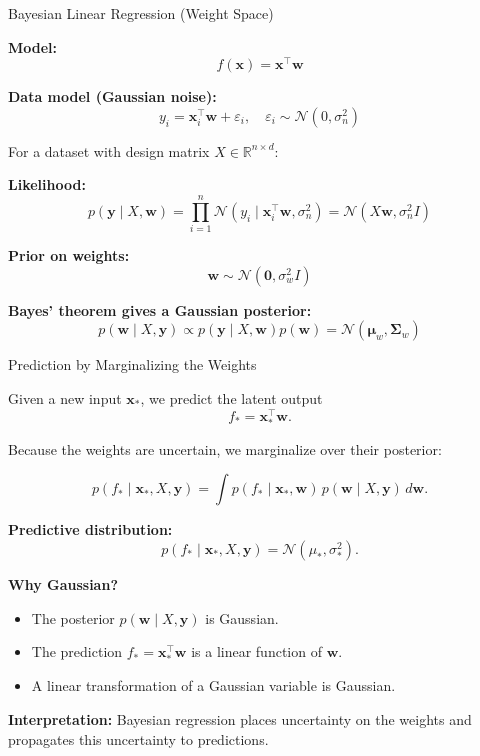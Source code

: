 \documentclass[9pt]{beamer}
\begin{document}
\begin{frame}{Bayesian Linear Regression (Weight Space)}

\textbf{Model:}
\[
f(\mathbf{x}) = \mathbf{x}^\top \mathbf{w}
\]

\textbf{Data model (Gaussian noise):}
\[
y_i = \mathbf{x}_i^\top \mathbf{w} + \varepsilon_i,
\quad
\varepsilon_i \sim \mathcal{N}(0,\sigma_n^2)
\]

For a dataset with design matrix $X \in \mathbb{R}^{n\times d}$:

\textbf{Likelihood:}
\[
p(\mathbf{y}\mid X,\mathbf{w})
=
\prod_{i=1}^n \mathcal{N}(y_i \mid \mathbf{x}_i^\top \mathbf{w},\sigma_n^2)
=
\mathcal{N}(X\mathbf{w},\sigma_n^2 I)
\]

\textbf{Prior on weights:}
\[
\mathbf{w} \sim \mathcal{N}(\mathbf{0},\sigma_w^2 I)
\]

\textbf{Bayes' theorem gives a Gaussian posterior:}
\[
p(\mathbf{w}\mid X,\mathbf{y})
\propto
p(\mathbf{y}\mid X,\mathbf{w})p(\mathbf{w})
=
\mathcal{N}(\boldsymbol{\mu}_w,\boldsymbol{\Sigma}_w)
\]

\end{frame}

\begin{frame}{Prediction by Marginalizing the Weights}

Given a new input $\mathbf{x}_*$, we predict the latent output
\[
f_* = \mathbf{x}_*^\top \mathbf{w}.
\]

Because the weights are uncertain, we marginalize over their posterior:

\[
p(f_* \mid \mathbf{x}_*, X, \mathbf{y})
=
\int p(f_* \mid \mathbf{x}_*, \mathbf{w})
\, p(\mathbf{w}\mid X,\mathbf{y})\, d\mathbf{w}.
\]

\textbf{Predictive distribution:}
\[
p(f_* \mid \mathbf{x}_*, X, \mathbf{y})
=
\mathcal{N}(\mu_*,\sigma_*^2).
\]

\textbf{Why Gaussian?}
\begin{itemize}
\item The posterior $p(\mathbf{w}\mid X,\mathbf{y})$ is Gaussian.
\item The prediction $f_* = \mathbf{x}_*^\top \mathbf{w}$ is a linear function of $\mathbf{w}$.
\item A linear transformation of a Gaussian variable is Gaussian.
\end{itemize}

\textbf{Interpretation:}  
Bayesian regression places uncertainty on the weights and propagates this
uncertainty to predictions.

\end{frame}
\end{document}
